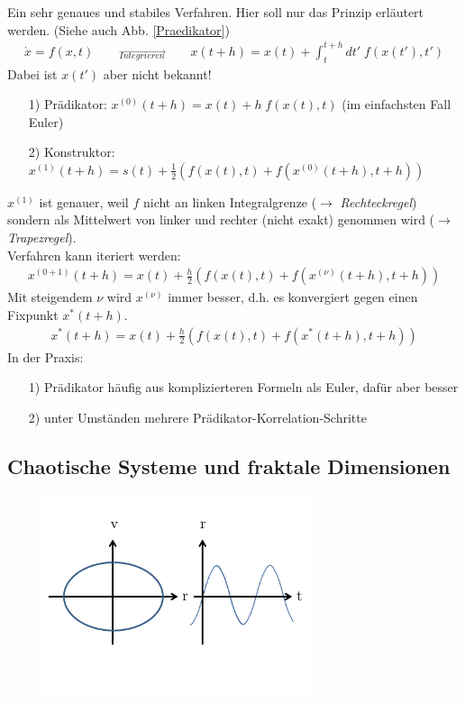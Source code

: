 \documentclass[12pt]{article}
\begin{document}
Ein sehr genaues und stabiles Verfahren. Hier soll nur das Prinzip erläutert werden. (Siehe auch Abb. \ref{Praedikator})
\begin{align*}
\dot{x}= f(x,t) \qquad \overrightarrow{_{Integrieren}} \qquad x(t+h) = x(t) + \int_t^{t+h} dt' \; f(x(t'), t') 
\end{align*}
Dabei ist $x(t')$ aber nicht bekannt!

\begin{enumerate}
\item[1)] Prädikator: $x^{(0)} (t+h) = x(t) + h \; f(x(t), t)$ (im einfachsten Fall Euler)
\item[2)] Konstruktor: $ x^{(1)} (t+h) = s(t) + \frac{1}{2} \left( f(x(t),t) + f(x^{(0)} (t+h), t+h)\right) $
\end{enumerate}
$x^{(1)}$ ist genauer, weil $f$ nicht an linken Integralgrenze ($\to$ \textit{Rechteckregel}) sondern als Mittelwert von linker und rechter (nicht exakt) genommen wird ($\to$ \textit{Trapezregel}). \\
Verfahren kann iteriert werden:
\begin{align*}
x^{(0+1)} (t+h) = x(t) + \frac{h}{2} \left( f(x(t),t) + f(x^{(\nu)} (t+h), t+h)\right) 
\end{align*}
Mit steigendem $\nu$ wird $x^{(\nu)}$ immer besser, d.h. es konvergiert gegen einen Fixpunkt $x^* (t+h)$.
\begin{align*}
x^* (t+h) = x(t) + \frac{h}{2} \left( f(x(t),t) + f(x^* (t+h), t+h)\right) 
\end{align*}
In der Praxis:
\begin{enumerate}
\item[1)] Prädikator häufig aus komplizierteren Formeln als Euler, dafür aber besser
\item[2)] unter Umständen mehrere Prädikator-Korrelation-Schritte
\end{enumerate}
\subsection{Chaotische Systeme und fraktale Dimensionen}

\begin{figure}[ht]
\centering
\includegraphics[width=0.7\textwidth]{Folie64.png}
	\caption{}
	\label{fig:Trajektorie}
\end{figure}
\end{document}
